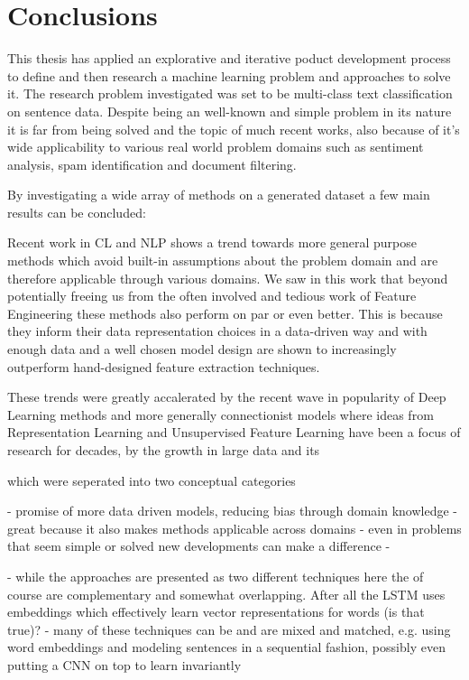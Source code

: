 
\clearpage

\section{Conclusions}
\label{sec:Conclusions}

This thesis has applied an explorative and iterative poduct development process to define and then research a machine learning problem and approaches to solve it. The research problem investigated was set to be multi-class text classification on sentence data. Despite being an well-known and simple problem in its nature it is far from being solved and the topic of much recent works, also because of it's wide applicability to various real world problem domains such as sentiment analysis, spam identification and document filtering.

By investigating a wide array of methods on a generated dataset a few main results can be concluded:

Recent work in \gls{CL} and \gls{NLP} shows a trend towards more general purpose methods which avoid built-in assumptions about the problem domain and are therefore applicable through various domains. We saw in this work that beyond potentially freeing us from the often involved and tedious work of \gls{Feature Engineering} these methods also perform on par or even better. This is because they inform their data representation choices in a data-driven way and with enough data and a well chosen model design are shown to increasingly outperform hand-designed feature extraction techniques. 

These trends were greatly accalerated by the recent wave in popularity of Deep Learning methods and more generally connectionist models where ideas from \gls{Representation Learning} and Unsupervised Feature Learning have been a focus of research for decades, by the growth in large data and its

 which were seperated into two conceptual categories


- promise of more data driven models, reducing bias through domain knowledge
- great because it also makes methods applicable across domains
- even in problems that seem simple or solved new developments can make a difference
-


- while the approaches are presented as two different techniques here the of course are complementary and somewhat overlapping. After all the LSTM uses embeddings which effectively learn vector representations for words (is that true)?
- many of these techniques can be and are mixed and matched, e.g. using word embeddings and modeling sentences in a sequential fashion, possibly even putting a CNN on top to learn invariantly

